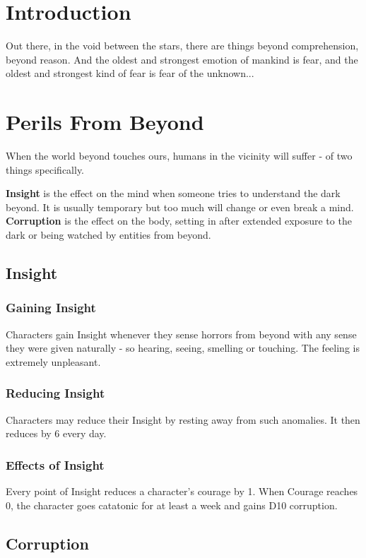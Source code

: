 \documentclass[12pt,a4paper,openany]{book}
\begin{document}
	
	
	\chapter{Introduction}
	Out there, in the void between the stars, there are things beyond comprehension, beyond reason. And the oldest and strongest emotion of mankind is fear, and the oldest and strongest kind of fear is fear of the unknown...

	\chapter{Perils From Beyond}
	When the world beyond touches ours, humans in the vicinity will suffer - of two things specifically.
	\par
	\textbf{Insight} is the effect on the mind when someone tries to understand the dark beyond. It is usually temporary but too much will change or even break a mind.
	\\
	\textbf{Corruption} is the effect on the body, setting in after extended exposure to the dark or being watched by entities from beyond.
	
	\section{Insight}
	\subsection{Gaining Insight}
	Characters gain Insight whenever they sense horrors from beyond with any sense they were given naturally - so hearing, seeing, smelling or touching. The feeling is extremely unpleasant.
	\subsection{Reducing Insight}
	Characters may reduce their Insight by resting away from such anomalies. It then reduces by 6 every day.
	\subsection{Effects of Insight}
	Every point of Insight reduces a character's courage by 1. When Courage reaches 0, the character goes catatonic for at least a week and gains D10 corruption.
	
	\section{Corruption}
\end{document}
